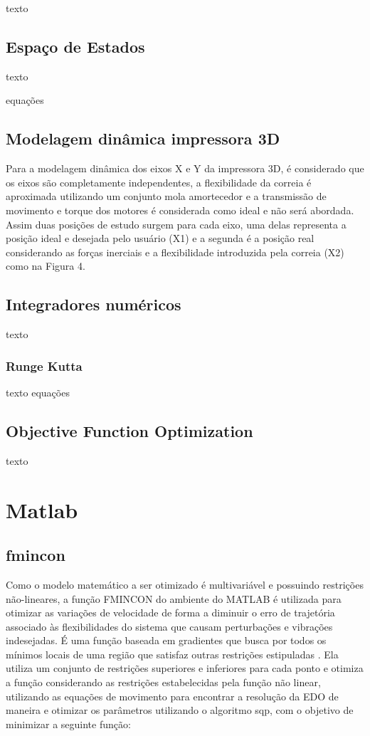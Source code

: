 texto

\subsection{Espaço de Estados}
texto

equações

\subsection{Modelagem dinâmica impressora 3D}

Para a modelagem dinâmica dos eixos X e Y da impressora 3D, 
é considerado que os eixos são completamente independentes, 
a flexibilidade da correia é aproximada utilizando um conjunto 
mola amortecedor e a transmissão de movimento e torque dos 
motores é considerada como ideal e não será abordada.
Assim duas posições de estudo surgem para cada eixo, uma delas 
representa a posição ideal e desejada pelo usuário (X1) e a 
segunda é a posição real considerando as forças inerciais e a 
flexibilidade introduzida pela correia (X2) como na Figura 4.

\subsection{Integradores numéricos}

texto


\subsubsection{Runge Kutta}
texto
equações


\subsection{Objective Function Optimization}
texto

\section{Matlab}

\subsection{fmincon}

Como o modelo matemático a ser otimizado é multivariável e 
possuindo restrições não-lineares, a função FMINCON do ambiente 
do MATLAB é utilizada para otimizar as variações de velocidade 
de forma a diminuir o erro de trajetória associado às 
flexibilidades do sistema que causam perturbações e vibrações 
indesejadas.
É uma função baseada em gradientes que busca por todos os 
mínimos locais de uma região que satisfaz outras restrições 
estipuladas \cite{albaghdadi21}.
Ela utiliza um conjunto de restrições superiores e inferiores 
para cada ponto e otimiza a função considerando as restrições 
estabelecidas pela função não linear, utilizando as equações de 
movimento para encontrar a resolução da EDO de maneira e 
otimizar os parâmetros utilizando o algoritmo sqp, com o 
objetivo de minimizar a seguinte função:


